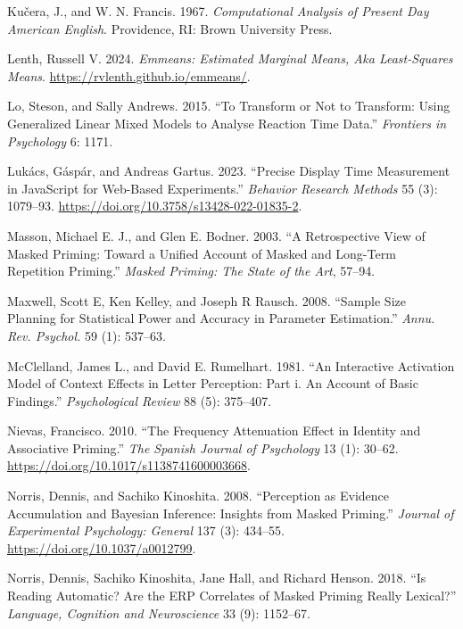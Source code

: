 \documentclass[
]{interact}
\newlength{\cslhangindent}
\newenvironment{CSLReferences}[2] %
 {\begin{list}{}{%
  \setlength{\itemindent}{0pt}
  \setlength{\leftmargin}{0pt}
  \setlength{\parsep}{0pt}
  \ifodd #1
   \setlength{\leftmargin}{\cslhangindent}
   \setlength{\itemindent}{-1\cslhangindent}
  \fi
  \setlength{\itemsep}{#2\baselineskip}}}
 {\end{list}}
\begin{document}
\begin{CSLReferences}{1}{0}
Kučera, J., and W. N. Francis. 1967. \emph{Computational Analysis of
Present Day American English}. Providence, RI: Brown University Press.

Lenth, Russell V. 2024. \emph{Emmeans: Estimated Marginal Means, Aka
Least-Squares Means}. \url{https://rvlenth.github.io/emmeans/}.

Lo, Steson, and Sally Andrews. 2015. {``To Transform or Not to
Transform: Using Generalized Linear Mixed Models to Analyse Reaction
Time Data.''} \emph{Frontiers in Psychology} 6: 1171.

Lukács, Gáspár, and Andreas Gartus. 2023. {``Precise Display Time
Measurement in JavaScript for Web-Based Experiments.''} \emph{Behavior
Research Methods} 55 (3): 1079--93.
\url{https://doi.org/10.3758/s13428-022-01835-2}.

Masson, Michael E. J., and Glen E. Bodner. 2003. {``A Retrospective View
of Masked Priming: Toward a Unified Account of Masked and Long-Term
Repetition Priming.''} \emph{Masked Priming: The State of the Art},
57--94.

Maxwell, Scott E, Ken Kelley, and Joseph R Rausch. 2008. {``Sample Size
Planning for Statistical Power and Accuracy in Parameter Estimation.''}
\emph{Annu. Rev. Psychol.} 59 (1): 537--63.

McClelland, James L., and David E. Rumelhart. 1981. {``An Interactive
Activation Model of Context Effects in Letter Perception: Part i. An
Account of Basic Findings.''} \emph{Psychological Review} 88 (5):
375--407.

Nievas, Francisco. 2010. {``The Frequency Attenuation Effect in Identity
and Associative Priming.''} \emph{The Spanish Journal of Psychology} 13
(1): 30--62. \url{https://doi.org/10.1017/s1138741600003668}.

Norris, Dennis, and Sachiko Kinoshita. 2008. {``Perception as Evidence
Accumulation and Bayesian Inference: Insights from Masked Priming.''}
\emph{Journal of Experimental Psychology: General} 137 (3): 434--55.
\url{https://doi.org/10.1037/a0012799}.

Norris, Dennis, Sachiko Kinoshita, Jane Hall, and Richard Henson. 2018.
{``Is Reading Automatic? Are the ERP Correlates of Masked Priming Really
Lexical?''} \emph{Language, Cognition and Neuroscience} 33 (9):
1152--67.


\end{CSLReferences}
\end{document}
